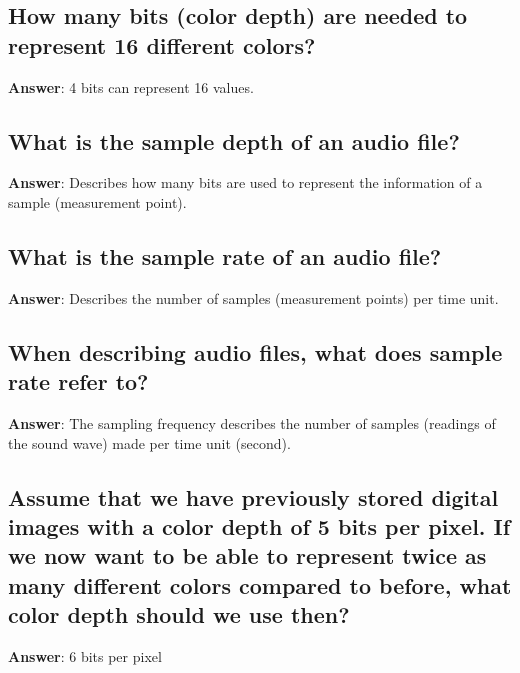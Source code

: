 \documentclass[a4paper,11pt,oneside]{article}
\begin{document}
\begin{sloppypar}
\subsection{How many bits (color depth) are needed to represent 16 different colors?}

\label{q:80:sa:en:True}

\textbf{Answer}: 4 bits can represent 16 values.



\subsection{What is the sample depth of an audio file?}

\label{q:81:sa:en:True}

\textbf{Answer}: Describes how many bits are used to represent the information of a sample (measurement point).



\subsection{What is the sample rate of an audio file?}

\label{q:82:sa:en:True}

\textbf{Answer}: Describes the number of samples (measurement points) per time unit.



\subsection{When describing audio files, what does sample rate refer to?}

\label{q:83:sa:en:True}

\textbf{Answer}: The sampling frequency describes the number of samples (readings of the sound wave) made per time unit (second).



\subsection{Assume that we have previously stored digital images with a color depth of 5 bits per pixel. If we now want to be able to represent twice as many different colors compared to before, what color depth should we use then?}

\label{q:84:sa:en:True}

\textbf{Answer}: 6 bits per pixel




\end{sloppypar}
\end{document}
